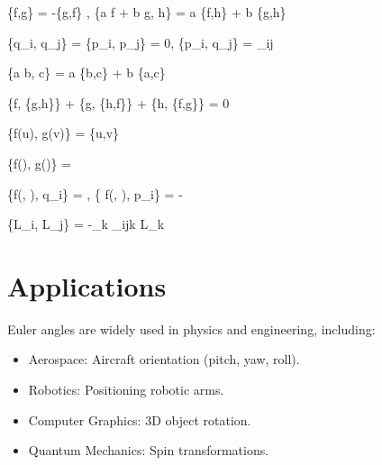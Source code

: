 \documentclass{article}
\begin{document}
\{f,g\} = -\{g,f\} , \quad \{a f + b g, h\} = a \{f,h\} + b \{g,h\}

\{q_i, q_j\} = \{p_i, p_j\} = 0, \quad \{p_i, q_j\} = \delta_{ij}

\{a b, c\} = a \{b,c\} + b \{a,c\}

\{f, \{g,h\}\} + \{g, \{h,f\}\} + \{h, \{f,g\}\} = 0

\{f(u), g(v)\} = \{u,v\}  

\{f(), g()\} = \sum {} 

\{f(, ), q_i\} = , \quad \{ f(, ), p_i\} = -

\{L_i, L_j\} = -\sum_k \epsilon_{ijk} L_k

\section{Applications}
Euler angles are widely used in physics and engineering, including:
\begin{itemize}
    \item Aerospace: Aircraft orientation (pitch, yaw, roll).
    \item Robotics: Positioning robotic arms.
    \item Computer Graphics: 3D object rotation.
    \item Quantum Mechanics: Spin transformations.
\end{itemize}
\end{document}
